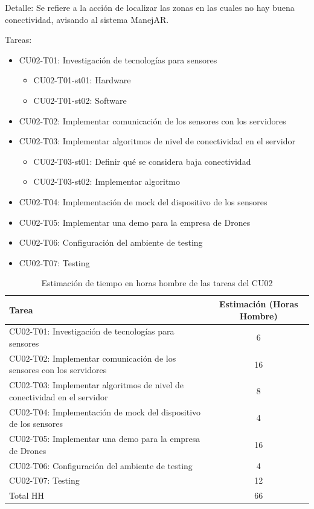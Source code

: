 Detalle: Se refiere a la acción de localizar las zonas en las cuales no hay buena 
conectividad, avisando al sistema ManejAR.


Tareas: 
\begin{itemize}

\item CU02-T01: Investigación de tecnologías para sensores
\begin{itemize}
\item CU02-T01-st01: Hardware
\item CU02-T01-st02: Software
\end{itemize}

\item CU02-T02: Implementar comunicación de los sensores con los servidores

\item CU02-T03: Implementar algoritmos de nivel de conectividad en el servidor 
\begin{itemize}
\item CU02-T03-st01: Definir qué se considera baja conectividad
\item CU02-T03-st02: Implementar algoritmo
\end{itemize}

\item CU02-T04: Implementación de mock del dispositivo de los sensores
\item CU02-T05: Implementar una demo para la empresa de Drones
\item CU02-T06: Configuración del ambiente de testing
\item CU02-T07: Testing

\end{itemize}

\begin{table}[htb]
\begin{center}
\begin{tabular}{|l|c|}
\hline
Tarea & Estimación (Horas Hombre) \\
\hline \hline
CU02-T01: Investigación de tecnologías para sensores & 6 \\ \hline
CU02-T02: Implementar comunicación de los sensores con los servidores & 16 \\ \hline
CU02-T03: Implementar algoritmos de nivel de conectividad en el servidor & 8 \\ \hline
CU02-T04: Implementación de mock del dispositivo de los sensores & 4 \\ \hline
CU02-T05: Implementar una demo para la empresa de Drones & 16 \\ \hline
CU02-T06: Configuración del ambiente de testing & 4 \\ \hline
CU02-T07: Testing & 12 \\ \hline \hline
Total HH & 66 \\ \hline
\end{tabular}
\caption{Estimación de tiempo en horas hombre de las tareas del CU02}
\end{center}
\end{table}


